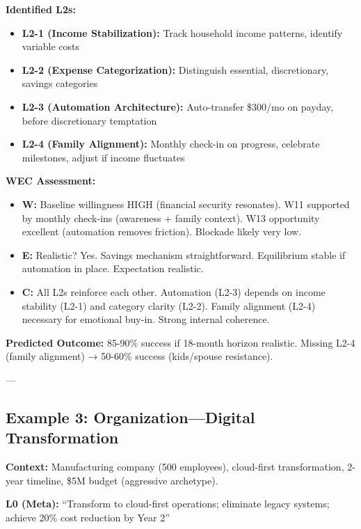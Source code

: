 \documentclass[11pt, a4paper]{article}
\begin{document}
\textbf{Identified L2s:}
\begin{itemize}[nosep]
    \item \textbf{L2-1 (Income Stabilization):} Track household income patterns, identify variable costs
    \item \textbf{L2-2 (Expense Categorization):} Distinguish essential, discretionary, savings categories
    \item \textbf{L2-3 (Automation Architecture):} Auto-transfer \$300/mo on payday, before discretionary temptation
    \item \textbf{L2-4 (Family Alignment):} Monthly check-in on progress, celebrate milestones, adjust if income fluctuates
\end{itemize}

\textbf{WEC Assessment:}
\begin{itemize}[nosep]
    \item \textbf{W:} Baseline willingness HIGH (financial security resonates). W11 supported by monthly check-ins (awareness + family context). W13 opportunity excellent (automation removes friction). Blockade likely very low.
    \item \textbf{E:} Realistic? Yes. Savings mechanism straightforward. Equilibrium stable if automation in place. Expectation realistic.
    \item \textbf{C:} All L2s reinforce each other. Automation (L2-3) depends on income stability (L2-1) and category clarity (L2-2). Family alignment (L2-4) necessary for emotional buy-in. Strong internal coherence.
\end{itemize}

\textbf{Predicted Outcome:} 85-90\% success if 18-month horizon realistic. Missing L2-4 (family alignment) → 50-60\% success (kids/spouse resistance).

---

\subsection{Example 3: Organization---Digital Transformation} \label{sec:ch15-part4d}

\textbf{Context:} Manufacturing company (500 employees), cloud-first transformation, 2-year timeline, \$5M budget (aggressive archetype).

\textbf{L0 (Meta):} ``Transform to cloud-first operations; eliminate legacy systems; achieve 20\% cost reduction by Year 2''
\end{document}
